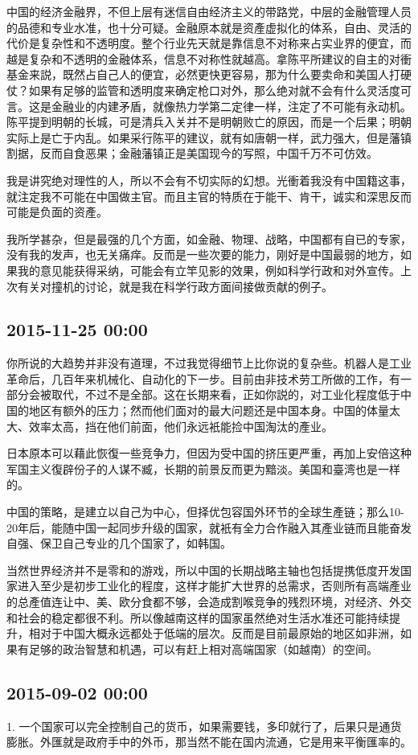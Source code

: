 \documentclass[twocolumn]{ctexart}
\begin{document}
中国的经济金融界，不但上层有迷信自由经济主义的带路党，中层的金融管理人员的品德和专业水准，也十分可疑。金融原本就是资產虚拟化的体系，自由、灵活的代价是复杂性和不透明度。整个行业先天就是靠信息不对称来占实业界的便宜，而越是复杂和不透明的金融体系，信息不对称性就越高。拿陈平所建议的自主的对衝基金来説，既然占自己人的便宜，必然更快更容易，那为什么要卖命和美国人打硬仗？如果有足够的监管和透明度来确定枪口对外，那么绝对就不会有什么灵活度可言。这是金融业的内建矛盾，就像热力学第二定律一样，注定了不可能有永动机。陈平提到明朝的长城，可是清兵入关并不是明朝败亡的原因，而是一个后果；明朝实际上是亡于内乱。如果采行陈平的建议，就有如唐朝一样，武力强大，但是藩镇割据，反而自食恶果；金融藩镇正是美国现今的写照，中国千万不可仿效。

我是讲究绝对理性的人，所以不会有不切实际的幻想。光衝着我没有中国籍这事，就注定我不可能在中国做主官。而且主官的特质在于能干、肯干，诚实和深思反而可能是负面的资產。

我所学甚杂，但是最强的几个方面，如金融、物理、战略，中国都有自已的专家，没有我的发声，也无关痛痒。反而是一些次要的能力，刚好是中国最弱的地方，如果我的意见能获得采纳，可能会有立竿见影的效果，例如科学行政和对外宣传。上次有关对撞机的讨论，就是我在科学行政方面间接做贡献的例子。\subsection*{2015-11-25 00:00}
你所说的大趋势并非没有道理，不过我觉得细节上比你说的复杂些。机器人是工业革命后，几百年来机械化、自动化的下一步。目前由非技术劳工所做的工作，有一部分会被取代，不过不是全部。这在长期来看，正如你説的，对工业化程度低于中国的地区有额外的压力；然而他们面对的最大问题还是中国本身。中国的体量太大、效率太高，挡在他们前面，他们永远衹能捡中国淘汰的產业。

日本原本可以藉此恢復一些竞争力，但因为受中国的挤压更严重，再加上安倍这种军国主义復辟份子的人谋不臧，长期的前景反而更为黯淡。美国和臺湾也是一样的。

中国的策略，是建立以自己为中心，但择优包容国外环节的全球生產链；那么10-20年后，能随中国一起同步升级的国家，就衹有全力合作融入其產业链而且能奋发自强、保卫自己专业的几个国家了，如韩国。

当然世界经济并不是零和的游戏，所以中国的长期战略主轴也包括提携低度开发国家进入至少是初步工业化的程度，这样才能扩大世界的总需求，否则所有高端產业的总產值连让中、美、欧分食都不够，会造成割喉竞争的残烈环境，对经济、外交和社会的稳定都很不利。所以像越南这样的国家虽然绝对生活水准还可能持续提升，相对于中国大概永远都处于低端的层次。反而是目前最原始的地区如非洲，如果有足够的政治智慧和机遇，可以有赶上相对高端国家（如越南）的空间。\subsection*{2015-09-02 00:00}
1. 一个国家可以完全控制自己的货币，如果需要钱，多印就行了，后果只是通货膨胀。外匯就是政府手中的外币，那当然不能在国内流通，它是用来平衡匯率的。
\end{document}
